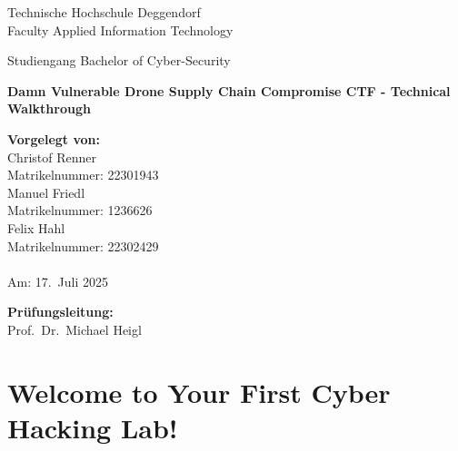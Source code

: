 \documentclass[12pt]{scrartcl}
\newcommand{\faculty}{Faculty Applied Information Technology}
\newcommand{\studies}{Bachelor of Cyber-Security}
\newcommand{\thesistitleDE}{Damn Vulnerable Drone Supply Chain Compromise CTF - Technical Walkthrough}
\newcommand{\submissiondate}{17.\ Juli 2025}
\newcommand{\supervisor}{Prof.\ Dr.\ Michael Heigl}
\begin{document}
    \begin{titlepage}
    \begin{center}
        {\Large Technische Hochschule Deggendorf\\
        \faculty\par}
        \vspace{0.2cm}
        {\Large Studiengang \studies\\}
        \vspace{2\baselineskip}
        {\Huge\bfseries \thesistitleDE\par}
        \vspace{3\baselineskip}
    \end{center}

    \vfill

    \parbox[t]{0.4\textwidth}{
        \textbf{Vorgelegt von:}\\[0.5em]
        Christof Renner\\
        Matrikelnummer: 22301943\\
        Manuel Friedl\\
        Matrikelnummer: 1236626\\
        Felix Hahl\\
        Matrikelnummer: 22302429\\[1em]
        \\
        Am: \submissiondate\par
    }
    \hfill
    \parbox[t]{0.4\textwidth}{
        \textbf{Prüfungsleitung:}\\[0.5em]
        \supervisor
    }
    \end{titlepage}

    \cleardoublepage
    \tableofcontents
    \cleardoublepage

    \section{Welcome to Your First Cyber Hacking Lab!}
\end{document}
